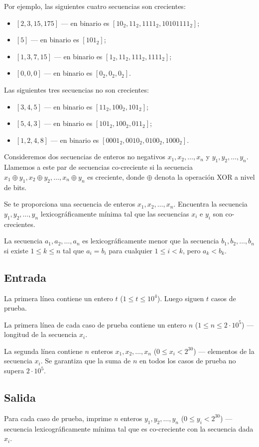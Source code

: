\documentclass{article}
\begin{document}
Por ejemplo, las siguientes cuatro secuencias son crecientes:
\begin{itemize}
  \item \( [2, 3, 15, 175] \) — en binario es \( [10_2, 11_2, 1111_2, 10101111_2] \);
  \item \( [5] \) — en binario es \( [101_2] \);
  \item \( [1, 3, 7, 15] \) — en binario es \( [1_2, 11_2, 111_2, 1111_2] \);
  \item \( [0, 0, 0] \) — en binario es \( [0_2, 0_2, 0_2] \).
\end{itemize}

Las siguientes tres secuencias no son crecientes:
\begin{itemize}
  \item \( [3, 4, 5] \) — en binario es \( [11_2, 100_2, 101_2] \);
  \item \( [5, 4, 3] \) — en binario es \( [101_2, 100_2, 011_2] \);
  \item \( [1, 2, 4, 8] \) — en binario es \( [0001_2, 0010_2, 0100_2, 1000_2] \).
\end{itemize}

Consideremos dos secuencias de enteros no negativos \(x_1, x_2, \dots, x_n\) y \(y_1, y_2, \dots, y_n\). Llamemos a este par de secuencias co-creciente si la secuencia \(x_1 \oplus y_1, x_2 \oplus y_2, \dots, x_n \oplus y_n\) es creciente, donde \(\oplus\) denota la operación XOR a nivel de bits.

Se te proporciona una secuencia de enteros \(x_1, x_2, \dots, x_n\). Encuentra la secuencia \(y_1, y_2, \dots, y_n\) lexicográficamente mínima tal que las secuencias \(x_i\) e \(y_i\) son co-crecientes.

La secuencia \(a_1, a_2, \dots, a_n\) es lexicográficamente menor que la secuencia \(b_1, b_2, \dots, b_n\) si existe \(1 \le k \le n\) tal que \(a_i = b_i\) para cualquier \(1 \le i < k\), pero \(a_k < b_k\).

\subsection*{Entrada}
La primera línea contiene un entero \(t\) (\(1 \le t \le 10^4\)). Luego siguen \(t\) casos de prueba.

La primera línea de cada caso de prueba contiene un entero \(n\) (\(1 \le n \le 2 \cdot 10^5\)) — longitud de la secuencia \(x_i\).

La segunda línea contiene \(n\) enteros \(x_1, x_2, \dots, x_n\) (\(0 \le x_i < 2^{30}\)) — elementos de la secuencia \(x_i\). Se garantiza que la suma de \(n\) en todos los casos de prueba no supera \(2 \cdot 10^5\).

\subsection*{Salida}
Para cada caso de prueba, imprime \(n\) enteros \(y_1, y_2, \dots, y_n\) (\(0 \le y_i < 2^{30}\)) — secuencia lexicográficamente mínima tal que es co-creciente con la secuencia dada \(x_i\).
\end{document}
